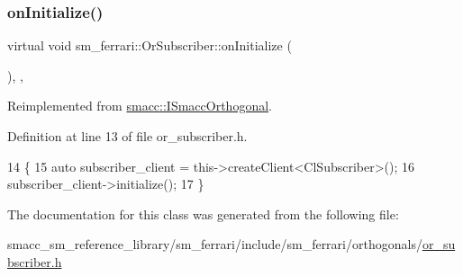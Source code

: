 \subsubsection{\texorpdfstring{on\+Initialize()}{onInitialize()}}
{\footnotesize\ttfamily virtual void sm\+\_\+ferrari\+::\+Or\+Subscriber\+::on\+Initialize (\begin{DoxyParamCaption}{ }\end{DoxyParamCaption})\hspace{0.3cm}{\ttfamily [inline]}, {\ttfamily [override]}, {\ttfamily [virtual]}}



Reimplemented from \hyperlink{classsmacc_1_1ISmaccOrthogonal_a6bb31c620cb64dd7b8417f8705c79c7a}{smacc\+::\+I\+Smacc\+Orthogonal}.



Definition at line 13 of file or\+\_\+subscriber.\+h.


\begin{DoxyCode}
14     \{
15         \textcolor{keyword}{auto} subscriber\_client = this->createClient<ClSubscriber>();
16         subscriber\_client->initialize();
17     \}
\end{DoxyCode}


The documentation for this class was generated from the following file\+:\begin{DoxyCompactItemize}
\item 
smacc\+\_\+sm\+\_\+reference\+\_\+library/sm\+\_\+ferrari/include/sm\+\_\+ferrari/orthogonals/\hyperlink{sm__ferrari_2include_2sm__ferrari_2orthogonals_2or__subscriber_8h}{or\+\_\+subscriber.\+h}\end{DoxyCompactItemize}
